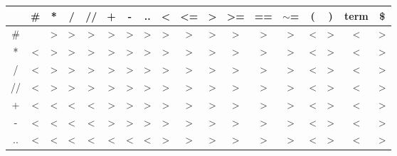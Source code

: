 \documentclass[11pt,a4paper]{article}
\begin{document}
        \begin{table}[h!]\centering %
            \begin{tabular}{|c|c|c|c|c|c|c|c|c|c|c|c|c|c|c|c|c|c|}
            \hline
             & \# & * & / & // & + & - & .. & \textless{} & \textless{}= & \textgreater{} & \textgreater{}= & == & $\sim$= & ( & ) & term & \$ \\ \hline
            \# &  & \textgreater{} & \textgreater{} & \textgreater{} & \textgreater{} & \textgreater{} & \textgreater{} & \textgreater{} & \textgreater{} & \textgreater{} & \textgreater{} & \textgreater{} & \textgreater{} & \textless{} & \textgreater{} & \textless{} & \textgreater{} \\ \hline
            * & \textless{} & \textgreater{} & \textgreater{} & \textgreater{} & \textgreater{} & \textgreater{} & \textgreater{} & \textgreater{} & \textgreater{} & \textgreater{} & \textgreater{} & \textgreater{} & \textgreater{} & \textless{} & \textgreater{} & \textless{} & \textgreater{} \\ \hline
            / & \textless{} & \textgreater{} & \textgreater{} & \textgreater{} & \textgreater{} & \textgreater{} & \textgreater{} & \textgreater{} & \textgreater{} & \textgreater{} & \textgreater{} & \textgreater{} & \textgreater{} & \textless{} & \textgreater{} & \textless{} & \textgreater{} \\ \hline
            // & \textless{} & \textgreater{} & \textgreater{} & \textgreater{} & \textgreater{} & \textgreater{} & \textgreater{} & \textgreater{} & \textgreater{} & \textgreater{} & \textgreater{} & \textgreater{} & \textgreater{} & \textless{} & \textgreater{} & \textless{} & \textgreater{} \\ \hline
            + & \textless{} & \textless{} & \textless{} & \textless{} & \textgreater{} & \textgreater{} & \textgreater{} & \textgreater{} & \textgreater{} & \textgreater{} & \textgreater{} & \textgreater{} & \textgreater{} & \textless{} & \textgreater{} & \textless{} & \textgreater{} \\ \hline
            - & \textless{} & \textless{} & \textless{} & \textless{} & \textgreater{} & \textgreater{} & \textgreater{} & \textgreater{} & \textgreater{} & \textgreater{} & \textgreater{} & \textgreater{} & \textgreater{} & \textless{} & \textgreater{} & \textless{} & \textgreater{} \\ \hline
            .. & \textless{} & \textless{} & \textless{} & \textless{} & \textless{} & \textless{} & \textless{} & \textgreater{} & \textgreater{} & \textgreater{} & \textgreater{} & \textgreater{} & \textgreater{} & \textless{} & \textgreater{} & \textless{} & \textgreater{} \\ \hline

\end{tabular}
\end{table}
\end{document}
